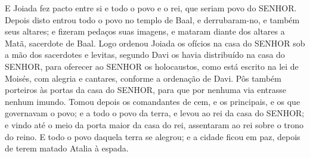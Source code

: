 {E Joiada fez pacto entre si e todo o povo e o rei, que seriam povo do SENHOR.
Depois disto entrou todo o povo no templo de Baal, e derrubaram-no, e também seus altares; e fizeram pedaços suas imagens, e mataram diante dos altares a Matã, sacerdote de Baal.
Logo ordenou Joiada os ofícios na casa do SENHOR sob a mão dos sacerdotes e levitas, segundo Davi os havia distribuído na casa do SENHOR, para oferecer ao SENHOR os holocaustos, como está escrito na lei de Moisés, com alegria e cantares, conforme a ordenação de Davi.
Pôs também porteiros às portas da casa do SENHOR, para que por nenhuma via entrasse nenhum imundo.
Tomou depois os comandantes de cem, e os principais, e os que governavam o povo; e a todo o povo da terra, e levou ao rei da casa do SENHOR; e vindo até o meio da porta maior da casa do rei, assentaram ao rei sobre o trono do reino.
E todo o povo daquela terra se alegrou; e a cidade ficou em paz, depois de terem matado Atalia à espada.

}
